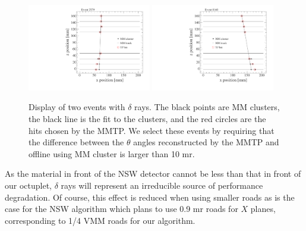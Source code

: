 \begin{figure}[!htpb]
  \begin{center}
    \includegraphics[width=0.48\textwidth]{figures/event_displays/display_02579.pdf}
    \includegraphics[width=0.48\textwidth]{figures/event_displays/display_08160.pdf}
  \end{center}
  \vspace{-10pt}
  \caption{Display of two events with $\delta$ rays. The black points are MM clusters, 
the black line is the fit to the clusters, and the red circles are the hits chosen by the MMTP. 
We select these events by requiring that the difference between the $\theta$ angles reconstructed by the MMTP and offline 
using MM cluster is larger than 10 mr.}
  \label{fig:deltarays}
\end{figure}
 As the material in front of the NSW detector cannot be less than that in front of our octuplet,  $\delta$ rays will  represent an irreducible source
 of performance degradation.  Of course, this effect is reduced when using smaller roads as is the case for the NSW algorithm which plans to use
 0.9 mr roads for $X$ planes,  corresponding to  1/4 VMM roads for our algorithm. 
 
